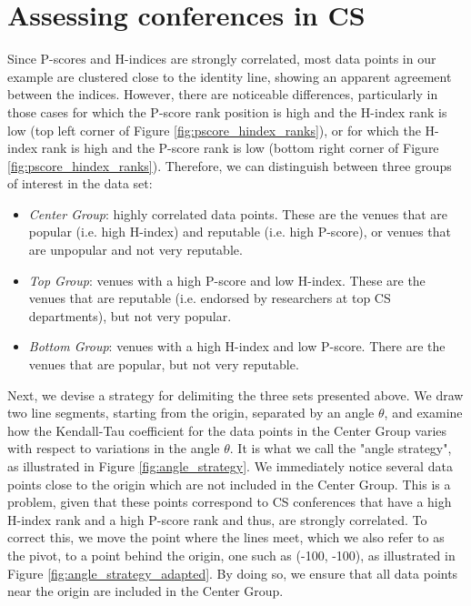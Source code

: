 \documentclass[notitlepage]{svjour3}
\begin{document}
\section{Assessing conferences in CS}
\label{sec:notifications}

Since P-scores and H-indices are strongly correlated, most data points in our example are clustered close to the identity 
line, showing an apparent agreement between the indices. However, there are noticeable differences, 
particularly in those cases for which the P-score rank position is high and the H-index rank is low 
(top left corner of Figure \ref{fig:pscore_hindex_ranks}), or for which the H-index rank is high and the 
P-score rank is low (bottom right corner of Figure \ref{fig:pscore_hindex_ranks}). Therefore, we 
can distinguish between three groups of interest in the data set:

\begin{itemize}
\item \textit{Center Group}: highly correlated data points. These are the venues that are popular (i.e. high H-index) and reputable (i.e. high P-score), or venues that are unpopular and not very reputable.
\item \textit{Top Group}: venues with a high P-score and low H-index. These are the venues that are reputable (i.e. endorsed by researchers at top CS departments), but not very popular.
\item \textit{Bottom Group}: venues with a high H-index and low P-score. There are the venues that are popular, but not very reputable.

\end{itemize}


Next, we devise a strategy for delimiting the three sets
presented above. We draw two line segments, starting from
the origin, separated by an angle $ \theta $, and examine
how the Kendall-Tau coefficient for the data points in the 
Center Group varies with respect to variations in the angle 
$ \theta $. It is what we call the "angle strategy", as 
illustrated in Figure \ref{fig:angle_strategy}. We immediately 
notice several data points close to the origin
which are not included in the Center Group. This is a problem, 
given that these points correspond to CS conferences that have a high H-index rank and a high
P-score rank and thus, are strongly correlated. To
correct this, we move the point where the lines meet, which we also
refer to as the pivot, to a point behind the origin, one
such as (-100, -100), as illustrated in Figure \ref{fig:angle_strategy_adapted}. 
By doing so, we ensure that all data points near the origin are included in the
Center Group.
\end{document}
